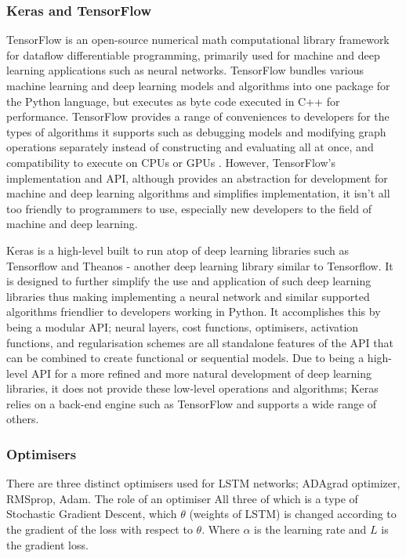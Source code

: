 \documentclass[oneside, 12pt]{article}
\begin{document}
			\subsubsection{Keras and TensorFlow}
			TensorFlow is an open-source numerical math computational library framework for dataflow differentiable programming, primarily used for machine and deep learning applications such as neural networks. TensorFlow bundles various machine learning and deep learning models and algorithms into one package for the Python language, but executes as byte code executed in C++ for performance. TensorFlow provides a range of conveniences to developers for the types of algorithms it supports such as debugging models and modifying graph operations separately instead of constructing and evaluating all at once, and compatibility to execute on CPUs or GPUs \cite{26}. However, TensorFlow's implementation and API, although provides an abstraction for development for machine and deep learning algorithms and simplifies implementation, it isn't all too friendly to programmers to use, especially new developers to the field of machine and deep learning.
			
			Keras is a high-level built to run atop of deep learning libraries such as Tensorflow and Theanos - another deep learning library similar to Tensorflow. It is designed to further simplify the use and application of such deep learning libraries thus making implementing a neural network and similar supported algorithms friendlier to developers working in Python. It accomplishes this by being a modular API; neural layers, cost functions, optimisers, activation functions, and regularisation schemes are all standalone features of the API that can be combined to create functional or sequential models. Due to being a high-level API for a more refined and more natural development of deep learning libraries, it does not provide these low-level operations and algorithms; Keras relies on a back-end engine such as TensorFlow and supports a wide range of others.
			
			\subsubsection{Optimisers}
			There are three distinct optimisers used for LSTM networks; ADAgrad optimizer, RMSprop, Adam. The role of an optimiser
			All three of which is a type of Stochastic Gradient Descent, which $\theta$ (weights of LSTM) is changed according to the gradient of the loss with respect to $\theta$. Where $\alpha$ is the learning rate and $L$ is the gradient loss. \cite{27}
			
\end{document}
